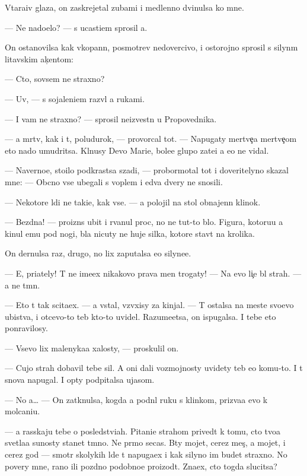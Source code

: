 \documentclass[10pt]{book}
\begin{document}
V{\yi}tara{\x}iv glaza, on zaskrejetal zubami i medlenno dvinulsa ko mne.

— Ne nado{\y}elo? — s ucasti{\y}em sprosil {\y}a.

On ostanovilsa kak vkopann{\yi}{\y}, posmotrev nedovercivo, i ostorojno sprosil s silyn{\yi}m litavskim ak{\c}entom:

— Cto, sovsem ne straxno?

— Uv{\yi}, — s sojaleni{\y}em razv{\e}l {\y}a rukami.

— I vam ne straxno? — sprosil neizvestn{\yi}{\y} u Propovednika.

— {\Y}a m{\e}rtv, kak i t{\yi}, poludurok, — provorcal tot. — Napugaty mertve{\c}a mertve{\c}om eto nado umudritsa. Kl{\ia}nusy Devo{\y} Mari{\y}e{\y}, bole{\y}e glupo{\y} zate{\y}i {\y}a {\y}e{\x}o ne vidal.

— Naverno{\y}e, sto{\y}ilo podkrastsa szadi, — probormotal tot i doveritelyno skazal mne: — Ob{\yi}cno vse ubegali s voplem i {\y}edva dvery ne snosili.

— Nekotor{\yi}{\y}e l{\iu}di ne taki{\y}e, kak vse. — {\Y}a polojil na stol obnajenn{\yi}{\y} klinok.

— Bezdna! — proizn{\e}s ubit{\yi}{\y} i rvanul proc, no ne tut-to b{\yi}lo. Figura, kotoru{\y}u {\y}a kinul {\y}emu pod nogi, b{\yi}la nicuty ne huje silka, kotor{\yi}{\y}e stav{\ia}t na krolika.

On dernulsa raz, drugo{\y}, no lix zaputalsa {\y}e{\x}o silyne{\y}e.

— E{\y}, pri{\y}ately! T{\yi} ne ime{\y}ex nikakovo prava men{\ia} trogaty! — Na {\y}evo li{\c}e b{\yi}l strah. — {\Y}a ne t{\e}mn{\yi}{\y}.

— Eto t{\yi} tak scita{\y}ex. — {\Y}a vstal, vz{\ia}vxisy za kinjal. — T{\yi} ostalsa na meste svo{\y}evo ubi{\y}stva, i otcevo-to teb{\ia} kto-to uvidel. Razume{\y}etsa, on ispugalsa. I tebe eto ponravilosy.

— Vsevo lix malenyka{\y}a xalosty, — proskulil on.

— Cujo{\y} strah dobavil tebe sil. A oni dali vozmojnosty uvidety teb{\ia} {\y}e{\x}o komu-to. I t{\yi} snova napugal. I op{\ia}ty podpitalsa ujasom.

— No {\y}a… — On zatknulsa, kogda {\y}a podn{\ia}l ruku s klinkom, priz{\yi}va{\y}a {\y}evo k molcani{\y}u.

— {\Y}a rasskaju tebe o posledstvi{\y}ah. Pitani{\y}e strahom prived{\e}t k tomu, cto tvo{\y}a svetla{\y}a su{\x}nosty stanet t{\e}mno{\y}. Ne pr{\ia}mo se{\y}cas. B{\yi}ty mojet, cerez mes{\ia}{\c}, a mojet, i cerez god — smotr{\ia} skolykih l{\iu}de{\y} t{\yi} napuga{\y}ex i kak silyno im budet straxno. No povery mne, rano ili pozdno podobno{\y}e proizo{\y}d{\e}t. Zna{\y}ex, cto togda slucitsa?
\end{document}

